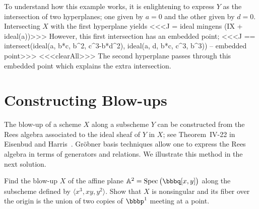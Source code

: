 To understand how this example works, it is enlightening to express
$Y$ as the intersection of two hyperplanes; one given by $a = 0$ and
the other given by $d = 0$.  Intersecting $X$ with the first
hyperplane yields
<<<J = ideal mingens (IX + ideal(a))>>>
However, this first intersection has an embedded point;
<<<J == intersect(ideal(a, b*c, b^2, c^3-b*d^2), 
     ideal(a, d, b*c, c^3, b^3)) -- embedded point>>>
<<<clearAll>>>
The second hyperplane passes through this embedded
point which explains the extra intersection.


\section{Constructing Blow-ups}

The blow-up of a scheme $X$ along a subscheme $Y$ can
be constructed from the Rees algebra associated to
the ideal sheaf of $Y$ in $X$; see Theorem~IV-22 in Eisenbud and
Harris~\cite{SC:EH}.  Gr\"{o}bner basis techniques allow one to
express the Rees algebra in terms of generators and relations.  We
illustrate this method in the next solution.

\begin{problem*}
Find the blow-up $X$ of the affine plane
$\mathbb{A}^{2} = \Spec\big( \bbbq[x, y] \big)$ along the subscheme
defined by $\langle x^{3}, xy, y^{2} \rangle$.  Show that $X$ is
nonsingular and its fiber over the origin is the union of two copies
of $\bbbp^{1}$ meeting at a point.
\end{problem*}

